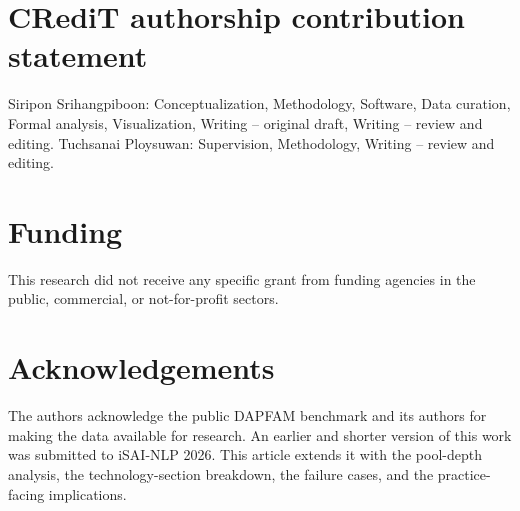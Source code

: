 \documentclass[preprint,11pt,authoryear]{elsarticle}
\begin{document}
\section*{CRediT authorship contribution statement}

Siripon Srihangpiboon: Conceptualization, Methodology, Software, Data curation, Formal analysis, Visualization, Writing -- original draft, Writing -- review and editing. Tuchsanai Ploysuwan: Supervision, Methodology, Writing -- review and editing.

\section*{Funding}

This research did not receive any specific grant from funding agencies in the public, commercial, or not-for-profit sectors.

\section*{Acknowledgements}

The authors acknowledge the public DAPFAM benchmark and its authors for making the data available for research. An earlier and shorter version of this work was submitted to iSAI-NLP 2026. This
article extends it with the pool-depth analysis, the technology-section
breakdown, the failure cases, and the practice-facing implications.



\end{document}
